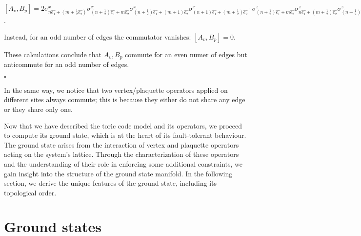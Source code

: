 \documentclass{Configuration_Files/PoliMi3i_thesis}
\begin{document}
\begin{center}
	
	$[A_{v},B_{p}] = 2
	\sigma^x_{n\hat{e_1} + (m+\frac{1}{2}\hat{e_2})} \sigma^x_{(n+ \frac{1}{2})\hat{e_1} + m\hat{e_2}} \sigma^x_{(n+ \frac{1}{2})\hat{e_1} + (m + 1)\hat{e_2}} \sigma^x_{(n+ 1)\hat{e_1} + (m + \frac{1}{2})\hat{e_2}} \cdot
	\sigma^z_{(n+\frac{1}{2})\hat{e_1} + m\hat{e_2}} \sigma^z_{n\hat{e_1}+(m+\frac{1}{2})\hat{e_2}} \sigma^z_{(n-\frac{1}{2})\hat{e_1} + m\hat{e_2}} \sigma^z_{n\hat{e_1}+(m-\frac{1}{2})\hat{e_2}} $. \newline

\end{center}
Instead, for an odd number of edges the commutator vanishes: $[A_{v},B_{p}]=0$.

These calculations conclude that $A_{v},B_{p}$ commute for an even numer of edges but anticommute for an odd number of edges.

\hfill $\square$

In the same way, we notice that two vertex/plaquette operators applied on different sites always commute; this is because they either do not share any edge or they share only one.\newline

Now that we have described the toric code model and its operators, we proceed to compute its ground state, which is at the heart of its fault-tolerant behaviour. The ground state arises from the interaction of vertex and plaquette operators acting on the system's lattice. Through the characterization of these operators and the understanding of their role in enforcing some additional constraints, we gain insight into the structure of the ground state manifold. \newline
In the following section, we derive the unique features of the ground state, including its topological order. \newline 




















\newpage
\section{Ground states}
\label{sec:GS}
\end{document}
